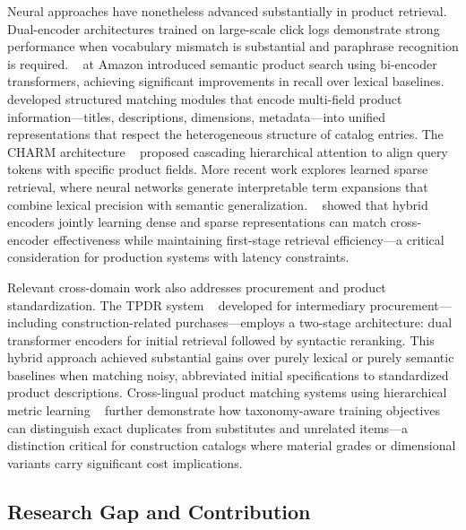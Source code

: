 \documentclass[preprint,12pt]{elsarticle}
\begin{document}
Neural approaches have nonetheless advanced substantially in product retrieval. Dual-encoder architectures trained on large-scale click logs demonstrate strong performance when vocabulary mismatch is substantial and paraphrase recognition is required. ~\cite{nigamSemanticProductSearch2019a} at Amazon introduced semantic product search using bi-encoder transformers, achieving significant improvements in recall over lexical baselines. ~\cite{choiSemanticProductSearch2020} developed structured matching modules that encode multi-field product information—titles, descriptions, dimensions, metadata—into unified representations that respect the heterogeneous structure of catalog entries. The CHARM architecture ~\cite{freymuthHierarchicalMultifieldRepresentations2025} proposed cascading hierarchical attention to align query tokens with specific product fields. More recent work explores learned sparse retrieval, where neural networks generate interpretable term expansions that combine lexical precision with semantic generalization. ~\cite{biswasEfficientInterpretableInformation2024} showed that hybrid encoders jointly learning dense and sparse representations can match cross-encoder effectiveness while maintaining first-stage retrieval efficiency—a critical consideration for production systems with latency constraints.

Relevant cross-domain work also addresses procurement and product standardization. The TPDR system ~\cite{cunhaTPDRNovelTwoStep2023} developed for intermediary procurement—including construction-related purchases—employs a two-stage architecture: dual transformer encoders for initial retrieval followed by syntactic reranking. This hybrid approach achieved substantial gains over purely lexical or purely semantic baselines when matching noisy, abbreviated initial specifications to standardized product descriptions. Cross-lingual product matching systems using hierarchical metric learning ~\cite{kooDeepMetricLearning2023} further demonstrate how taxonomy-aware training objectives can distinguish exact duplicates from substitutes and unrelated items—a distinction critical for construction catalogs where material grades or dimensional variants carry significant cost implications.

\subsection{Research Gap and Contribution}
\end{document}
